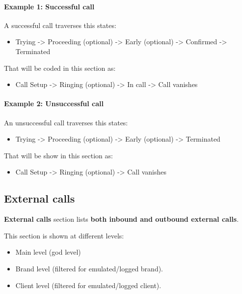 \documentclass[letterpaper,10pt,spanish]{sphinxmanual}
\begin{document}
\paragraph{Example 1: Successful call}

A successful call traverses this states:
\begin{itemize}
\item {} 
Trying -\textgreater{} Proceeding (optional) -\textgreater{} Early (optional) -\textgreater{} Confirmed -\textgreater{} Terminated

\end{itemize}

That will be coded in this section as:
\begin{itemize}
\item {} 
Call Setup -\textgreater{} Ringing (optional) -\textgreater{} In call -\textgreater{} Call vanishes

\end{itemize}
\paragraph{Example 2: Unsuccessful call}

An unsuccessful call traverses this states:
\begin{itemize}
\item {} 
Trying -\textgreater{} Proceeding (optional) -\textgreater{} Early (optional) -\textgreater{} Terminated

\end{itemize}

That will be show in this section as:
\begin{itemize}
\item {} 
Call Setup -\textgreater{} Ringing (optional) -\textgreater{} Call vanishes

\end{itemize}


\subsection{External calls}
\label{administration_portal/brand/calls/external_calls::doc}\label{administration_portal/brand/calls/external_calls:external-calls}
\textbf{External calls} section lists \textbf{both inbound and outbound external calls}.

This section is shown at different levels:
\begin{itemize}
\item {} 
Main level (god level)

\item {} 
Brand level (filtered for emulated/logged brand).

\item {} 
Client level (filtered for emulated/logged client).

\end{itemize}
\end{document}

